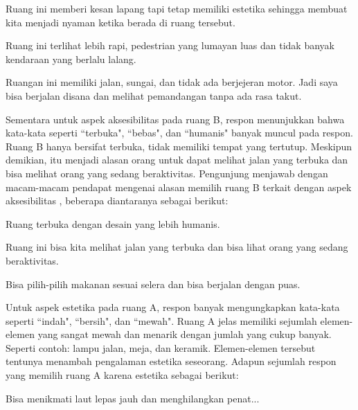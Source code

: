 \documentclass[11pt]{udthesis} %
\begin{document}
\begin{quoting}
    Ruang ini memberi kesan lapang tapi tetap memiliki estetika sehingga membuat kita menjadi nyaman ketika berada di ruang tersebut.
\end{quoting}

\begin{quoting}
    Ruang ini terlihat lebih rapi, pedestrian yang lumayan luas dan tidak banyak kendaraan yang berlalu lalang.
\end{quoting}

\begin{quoting}
    Ruangan ini memiliki jalan, sungai, dan tidak ada berjejeran motor. Jadi saya bisa berjalan disana dan melihat pemandangan tanpa ada rasa takut.
\end{quoting}

Sementara untuk aspek aksesibilitas pada ruang B, respon menunjukkan bahwa kata-kata seperti ``terbuka", ``bebas", dan ``humanis" banyak muncul pada respon. Ruang B hanya bersifat terbuka, tidak memiliki tempat yang tertutup. Meskipun demikian, itu menjadi alasan orang untuk dapat melihat jalan yang terbuka dan bisa melihat orang yang sedang beraktivitas. Pengunjung menjawab dengan macam-macam pendapat mengenai alasan memilih ruang B terkait dengan aspek aksesibilitas , beberapa diantaranya sebagai berikut:

\begin{quoting}
    Ruang terbuka dengan desain yang lebih humanis.
\end{quoting}

\begin{quoting}
    Ruang ini bisa kita melihat jalan yang terbuka dan bisa lihat orang yang sedang beraktivitas.
\end{quoting}

\begin{quoting}
    Bisa pilih-pilih makanan sesuai selera dan bisa berjalan dengan puas.
\end{quoting}

Untuk aspek estetika pada ruang A, respon banyak mengungkapkan kata-kata seperti ``indah", ``bersih", dan ``mewah". Ruang A jelas memiliki sejumlah elemen-elemen yang sangat mewah dan menarik dengan jumlah yang cukup banyak. Seperti contoh: lampu jalan, meja, dan keramik. Elemen-elemen tersebut tentunya menambah pengalaman estetika seseorang. Adapun sejumlah respon yang memilih ruang A karena estetika sebagai berikut:

\begin{quoting}
   Bisa menikmati laut lepas jauh dan menghilangkan penat...
\end{quoting}
\end{document}
